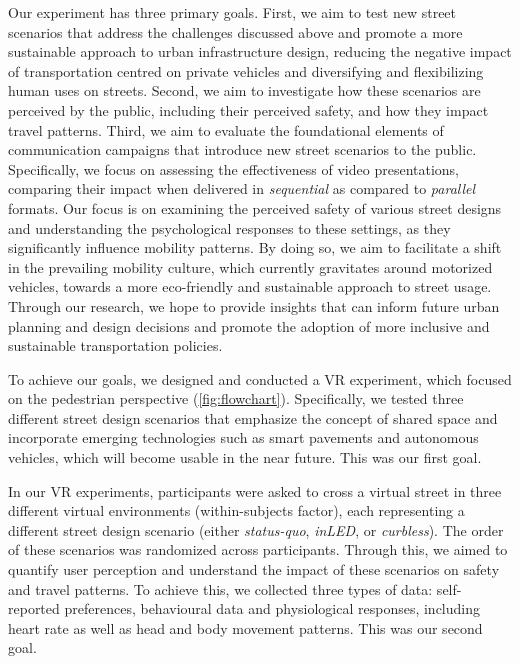 Our experiment has three primary goals. 
First, we aim to test new street scenarios that address the challenges discussed above and promote a more sustainable approach to urban infrastructure design, reducing the negative impact of transportation centred on private vehicles and diversifying and flexibilizing human uses on streets. 
Second, we aim to investigate how these scenarios are perceived by the public, including their perceived safety, and how they impact travel patterns. 
Third, we aim to evaluate the foundational elements of communication campaigns that introduce new street scenarios to the public. Specifically, we focus on assessing the effectiveness of video presentations, comparing their impact when delivered in \emph{sequential} as compared to \emph{parallel} formats.
Our focus is on examining the perceived safety of various street designs and understanding the psychological responses to these settings, as they significantly influence mobility patterns. By doing so, we aim to facilitate a shift in the prevailing mobility culture, which currently gravitates around motorized vehicles, towards a more eco-friendly and sustainable approach to street usage. Through our research, we hope to provide insights that can inform future urban planning and design decisions and promote the adoption of more inclusive and sustainable transportation policies.


To achieve our goals, we designed and conducted a VR experiment, which focused on the pedestrian perspective (\autoref{fig:flowchart}). Specifically, we tested three different street design scenarios that emphasize the concept of shared space and incorporate emerging technologies such as smart pavements and autonomous vehicles, which will become usable in the near future. This was our first goal. 

In our VR experiments, participants were asked to cross a virtual street in three different virtual environments (within-subjects factor), each representing a different street design scenario (either \emph{status-quo}, \emph{inLED}, or \emph{curbless}). The order of these scenarios was randomized across participants. Through this, we aimed to quantify user perception and understand the impact of these scenarios on safety and travel patterns. To achieve this, we collected three types of data: self-reported preferences, behavioural data and physiological responses, including heart rate as well as head and body movement patterns. This was our second goal. 

